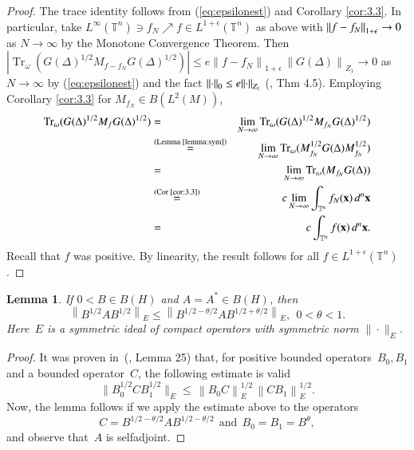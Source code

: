 \documentclass[final,1p]{elsarticle}
\numberwithin{equation}{section}
\theoremstyle{plain}
\newtheorem{lemma}[thm]{Lemma}
\theoremstyle{definition}
\begin{document}
\begin{proof}
  The trace identity follows from (\ref{eq:epsilonest}) and Corollary \ref{cor:3.3}.  In particular, take $L^\infty({\ensuremath{\mathbb{T}}}^n) \ni f_N \nearrow f \in L^{1+\epsilon}({\ensuremath{\mathbb{T}}}^n)$ as above with ${\mbox{\ensuremath{\| {f-f_N} \|}}}_{1+\epsilon} \to 0$ as $N \to \infty$ by the Monotone Convergence Theorem.
Then $|\operatorname{Tr}_\omega(G(\Delta)^{1/2} M_{f - f_N} G(\Delta)^{1/2})| \leq e \left\| f -f_N \right\|_{1 + \epsilon} \, \left\| G(\Delta)  \right\|_{Z_1} \to 0$ as $N \to \infty$ by (\ref{eq:epsilonest}) and the fact ${\mbox{\ensuremath{\| {\cdot} \|}}}_0 \leq e {\mbox{\ensuremath{\| {\cdot} \|}}}_{Z_1}$ (\cite{CRSS}, Thm 4.5).  Employing Corollary \ref{cor:3.3}
  for $M_{f_N} \in B(L^2(M))$,
  \begin{eqnarray*}
  \operatorname{Tr}_\omega(G(\Delta)^{1/2} M_f G(\Delta)^{1/2}) & = & \lim_{N \to \infty}   \operatorname{Tr}_\omega(G(\Delta)^{1/2} M_{f_N} G(\Delta)^{1/2}) \\
  & \stackrel{\text{(Lemma \ref{lemma:sym})}}{=} & \lim_{N \to \infty}  \operatorname{Tr}_\omega(M_{f_N}^{1/2} G(\Delta) M_{f_N}^{1/2}) \\
  & = & \lim_{N \to \infty}  \operatorname{Tr}_\omega(M_{f_N} G(\Delta)) \\
  & \stackrel{\text{(Cor \ref{cor:3.3})}}{=} & c \lim_{N \to \infty} \int_{{\ensuremath{\mathbb{T}}}^n} f_N(\mathbf{x}) \, d^n \mathbf{x} \\
  & = & c \int_{{\ensuremath{\mathbb{T}}}^n} f(\mathbf{x}) \, d^n \mathbf{x} .
  \end{eqnarray*}
Recall that $f$ was positive.  By linearity, the result follows
for all $f \in L^{1+\epsilon}({\ensuremath{\mathbb{T}}}^n)$. 
\end{proof}

\begin{lemma}
  \label{IIIlineLemma}
  If $0 < B \in B(H)$ and $A = A^* \in B(H)$,
  then $$ \left\| B^{1/2} A
    B^{1/2} \right\|_E \leq \left\| B^{1/2 - \theta /2} A B^{1/2 +
      \theta/2} \right\|_E,\ \ 0 < \theta < 1. $$ Here~$E$ is a
  symmetric ideal of compact operators with symmetric norm $\| \cdot \|_E$.
\end{lemma}
\begin{proof}
  It was proven in~(\cite{CaPoSu}, Lemma 25) that, for positive
  bounded operators~$B_0, B_1$ and a bounded operator~$C$, the following
  estimate is valid $$ \| B_0^{1/2} C B_1^{1/2} \|_E \leq
  \, \left\| B_0 C \right\|_E^{1/2} \, \left\| C B_1
  \right\|^{1/2}_E. $$ Now, the lemma follows if we apply the estimate
  above to the operators $$ C = B^{1/2 - \theta /2} A B^{1/2 - \theta
    /2} \ \ \text{and}\ \ B_0 = B_1 = B^\theta, $$ and observe
  that~$A$ is selfadjoint.
\end{proof}
\end{document}
